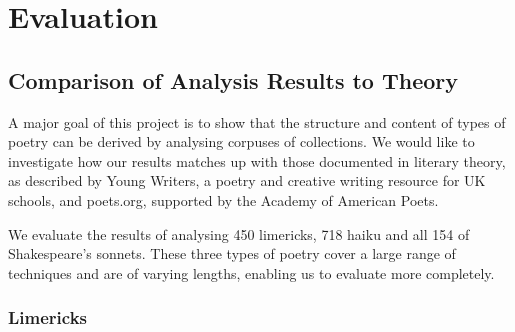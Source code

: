 \chapter{Evaluation}
\ifpdf
    \graphicspath{{Evaluation/EvaluationFigs/PNG/}{Evaluation/EvaluationFigs/PDF/}{Evaluation/EvaluationFigs/}}
\else
    \graphicspath{{Evaluation/EvaluationFigs/EPS/}{Evaluation/EvaluationFigs/}}
\fi

\section{Comparison of Analysis Results to Theory}
A major goal of this project is to show that the structure and content of types of poetry can be derived by analysing corpuses of collections. We would like to investigate how our results matches up with those documented in literary theory, as described by Young Writers\cite{youngwriters}, a poetry and creative writing resource for UK schools, and poets.org\cite{poetsorg}, supported by the Academy of American Poets.

We evaluate the results of analysing 450 limericks, 718 haiku and all 154 of Shakespeare's sonnets. These three types of poetry cover a large range of techniques and are of varying lengths, enabling us to evaluate more completely.

\subsection{Limericks}

